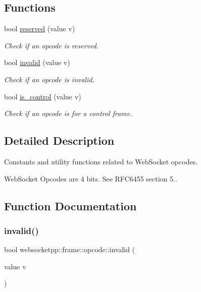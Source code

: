 \subsection*{Functions}
\begin{DoxyCompactItemize}
\item 
bool \mbox{\hyperlink{namespacewebsocketpp_1_1frame_1_1opcode_a9890345367f4c8bdf565d62e00afbc61}{reserved}} (value v)
\begin{DoxyCompactList}\small\item\em Check if an opcode is reserved. \end{DoxyCompactList}\item 
bool \mbox{\hyperlink{namespacewebsocketpp_1_1frame_1_1opcode_a6f451ade60e2cca4caac58347643443a}{invalid}} (value v)
\begin{DoxyCompactList}\small\item\em Check if an opcode is invalid. \end{DoxyCompactList}\item 
bool \mbox{\hyperlink{namespacewebsocketpp_1_1frame_1_1opcode_aa5e7f94a35f8fb59a925fa01636f08ad}{is\+\_\+control}} (value v)
\begin{DoxyCompactList}\small\item\em Check if an opcode is for a control frame. \end{DoxyCompactList}\end{DoxyCompactItemize}


\subsection{Detailed Description}
Constants and utility functions related to Web\+Socket opcodes. 

Web\+Socket Opcodes are 4 bits. See R\+F\+C6455 section 5.. 

\subsection{Function Documentation}
\mbox{\label{namespacewebsocketpp_1_1frame_1_1opcode_a6f451ade60e2cca4caac58347643443a}} 
\subsubsection{\texorpdfstring{invalid()}{invalid()}}
{\footnotesize\ttfamily bool websocketpp\+::frame\+::opcode\+::invalid (\begin{DoxyParamCaption}\item[{value}]{v }\end{DoxyParamCaption})\hspace{0.3cm}{\ttfamily [inline]}}




